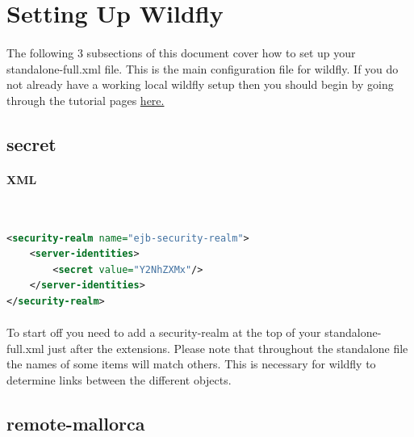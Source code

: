 \documentclass[
10pt, %
letterpaper, %
oneside, %
headinclude,footinclude, %
BCOR5mm, %
]{scrartcl}
\begin{document}

\section{Setting Up Wildfly}


\paragraph{} The following 3 subsections of this document cover how to set up your standalone-full.xml file. This is the main configuration file for wildfly. If you do not already have a working local wildfly setup then you should begin by going through the tutorial pages \href{https://docs.jboss.org/author/display/WFLY8/Getting+Started+Developing+Applications+Guide}{here.}


\subsection{secret}


\paragraph{XML}~
\begin{lstlisting}[language=XML]
<security-realm name="ejb-security-realm">
	<server-identities>
		<secret value="Y2NhZXMx"/>
	</server-identities>
</security-realm>
\end{lstlisting}

\paragraph{} To start off you need to add a security-realm at the top of your standalone-full.xml just after the extensions. Please note that throughout the standalone file the names of some items will match others. This is necessary for wildfly to determine links between the different objects. 


\subsection{remote-mallorca}
\end{document}
